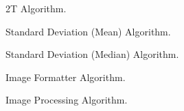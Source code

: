 \documentclass[journal]{IEEEtran}
\begin{document}
\begin{appendices}
    
    \begin{figure}[hbt!]
        \caption{2T Algorithm.}
        \label{algorithm:2t}
    \end{figure}
    
    
    \begin{figure}[hbt!]
        \caption{Standard Deviation (Mean) Algorithm.}
        \label{algorithm:sd-mean}
    \end{figure}
    
    
    \begin{figure}[hbt!]
        \caption{Standard Deviation (Median) Algorithm.}
        \label{algorithm:sd-median}
    \end{figure}

    
    \begin{figure}[hbt!]
        \caption{Image Formatter Algorithm.}
        \label{algorithm:image-formatter}
    \end{figure}

    
    \begin{figure}[hbt!]
        \caption{Image Processing Algorithm.}
        \label{algorithm:image-processor}
    \end{figure}
\end{appendices}
\end{document}
